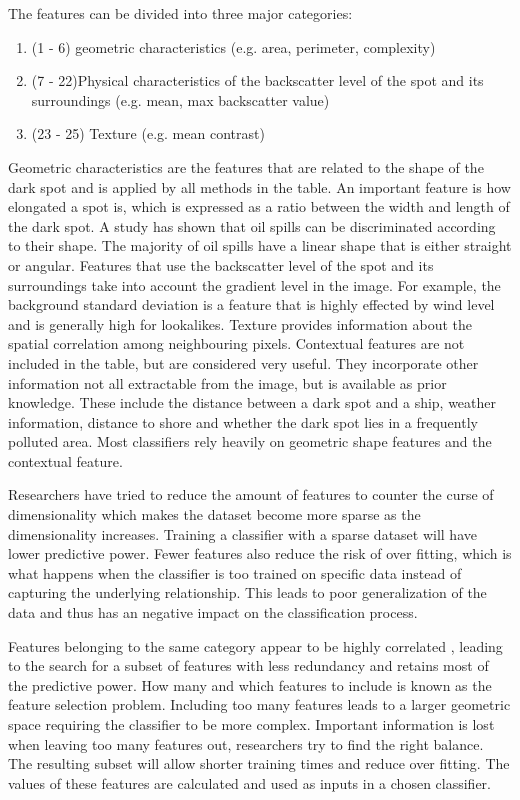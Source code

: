 The features can be divided into three major categories\cite{Brekke200595}:
\begin{enumerate}
\item (1 - 6) geometric characteristics (e.g. area, perimeter, complexity)
\item (7 - 22)Physical characteristics of the backscatter level of the spot and its surroundings (e.g. mean, max backscatter value)
\item (23 - 25) Texture (e.g. mean contrast)
\end{enumerate}

Geometric characteristics are the features that are related to the shape of the dark spot and is applied by all methods in the table\cite{Topouzelis200930}. An important feature is how elongated a spot is, which is expressed as a ratio between the width and length of the dark spot\cite{Gasull20071}. A study has shown that oil spills can be discriminated according to their shape\cite{Guo2014146}. The majority of oil spills have a linear shape that is either straight or angular\cite{Pavlakis200156}. Features that use the backscatter level of the spot and its surroundings take into account the gradient level in the image. For example, the background standard deviation is a feature that is highly effected by wind level and is generally high for lookalikes. Texture provides information about the spatial correlation among neighbouring pixels. Contextual features are not included in the table, but are considered very useful\cite{Topouzelis200930}. They incorporate other information not all extractable from the image, but is available as prior knowledge. These include the distance between a dark spot and a ship, weather information, distance to shore and whether the dark spot lies in a frequently polluted area. Most classifiers rely heavily on geometric shape features and the contextual feature.\cite{Xu201414}

Researchers have tried to reduce the amount of features to counter the curse of dimensionality which makes the dataset become more sparse as the dimensionality increases. Training a classifier with a sparse dataset will have lower predictive power. Fewer features also reduce the risk of over fitting, which is what happens when the classifier is too trained on specific data instead of capturing the underlying relationship. This leads to poor generalization of the data and thus has an negative impact on the classification process.

Features belonging to the same category appear to be highly correlated \cite{Xu201414}, leading to the search for a subset of features with less redundancy and retains most of the predictive power. How many and which features to include is known as the feature selection problem. Including too many features leads to a larger geometric space requiring the classifier to be more complex. Important information is lost when leaving too many features out, researchers try to find the right balance. The resulting subset will allow shorter training times and reduce over fitting. The values of these features are calculated and used as inputs in a chosen classifier.
